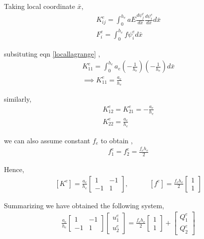 Taking local coordinate $\bar{x}$,
\begin{eqnarray}
	K_{ij}^e =  \int_{0}^{h_e} aE \frac{d\psi_j^e}{d\bar{x}} \frac{d\psi_i^e}{d\bar{x}} d\bar{x} \\
	F_i^e= \int_{0}^{h_e} f\psi_i^e d\bar{x}
\end{eqnarray}

subsituting eqn \ref{locallagrange} , 
\begin{eqnarray}
	K_{11}^e =  \int_{0}^{h_e} a_e \left( - \frac{1}{h_e}\right) \left( - \frac{1}{h_e}\right) d\bar{x} \\
	\implies K_{11}^e = \frac{a_e}{h_e}
\end{eqnarray}

similarly,
\begin{eqnarray}
	 K_{12}^e = K_{21}^e = -\frac{a_e}{h_e}\\
	 K_{22}^e = \frac{a_e}{h_e}
\end{eqnarray}

we can also assume constant $f_e$ to obtain ,
\begin{eqnarray}
	f_{1}^e = 	f_{2}^e = \frac{f_e h_e}{2}
\end{eqnarray}

Hence,
\begin{eqnarray}\label{stiffness}
	[K^e] = \frac{a_e}{h_e}
	\begin{bmatrix}
		1 & -1\\
		-1 & 1
	\end{bmatrix},\quad\quad\quad
	[f^e] = \frac{f_e h_e}{2}
\begin{bmatrix}
	1 \\
	1
\end{bmatrix}
\end{eqnarray}

Summarizing we have obtained the following system,
\begin{eqnarray}\label{system1}
	\frac{a_e}{h_e}
	\begin{bmatrix}
		1 & -1\\
		-1 & 1
	\end{bmatrix}
\begin{bmatrix}
	u_1^e \\
	u_2^e
\end{bmatrix}
 = \frac{f_e h_e}{2}
\begin{bmatrix}
	1 \\
	1
\end{bmatrix} + 
\begin{bmatrix}
	Q_1^e \\
	Q_2^e
\end{bmatrix}
\end{eqnarray}


